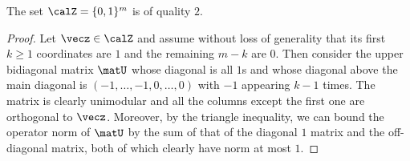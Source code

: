 \begin{claim}\label{clm:qualityofzeroone}
The set $\calZ=\{0,1\}^m$ is of quality $2$.
\end{claim}
\begin{proof}
Let $\vecz \in \calZ$ and assume without loss of generality that its first $k \ge 1$ coordinates are $1$
and the remaining $m-k$ are $0$. Then consider the upper bidiagonal matrix $\matU$ whose diagonal is all $1$s and whose
diagonal above the main diagonal is $(-1,\ldots,-1,0,\ldots,0)$ with $-1$ appearing $k-1$ times. The matrix is clearly
unimodular and all the columns except the first one are orthogonal to $\vecz$. Moreover, by the triangle inequality,
we can bound the operator norm of $\matU$ by the sum of that of the diagonal $1$ matrix and the off-diagonal matrix, both
of which clearly have norm at most $1$.
\end{proof}


